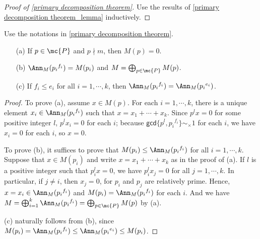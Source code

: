 \begin{proof}[Proof of \cref{primary decomposition theorem}]
    Use the results of \cref{primary decomposition theorem_lemma} inductively.
\end{proof}
\begin{cor}
    Use the notations in \cref{primary decomposition theorem}.
    \begin{enumerate}
        \item[(a)]
        {
            If $p\in\mc{P}$ and $p\nmid m$, then $M(p)=0$.
        }
        \item[(b)]
        {
            $\Ann_M({p_i}^{f_i})=M(p_i)$ and $M=\bigoplus_{p\in\mc{P}} M(p)$.
        }
        \item[(c)]
        {
            If $f_i\leq e_i$ for all $i=1, \cdots, k$, then $\Ann_M({p_i}^{f_i})=\Ann_M({p_i}^{e_i})$.
        }
    \end{enumerate}
\end{cor}
\begin{proof}
    To prove (a), assume $x\in M(p)$.
    For each $i=1, \cdots, k$, there is a unique element $x_i\in\Ann_M({p_i}^{f_i})$ such that $x=x_1+\cdots+x_k$.
    Since $p^l x=0$ for some positive integer $l$, $p^lx_i=0$ for each $i$; because $\textsf{gcd}\{p^l, {p_i}^{f_i}\}\sim_\times 1$ for each $i$, we have $x_i=0$ for each $i$, so $x=0$.

    To prove (b), it suffices to prove that $M(p_i)\leq\Ann_M({p_i}^{f_i})$ for all $i=1, \cdots, k$.
    Suppose that $x\in M(p_i)$ and write $x=x_1+\cdots+x_k$ as in the proof of (a).
    If $l$ is a positive integer such that $p_i^l x=0$, we have $p_i^l x_j=0$ for all $j=1, \cdots, k$.
    In particular, if $j\neq i$, then $x_j=0$, for $p_i$ and $p_j$ are relatively prime.
    Hence, $x=x_i\in\Ann_M({p_i}^{f_i})$ and $M(p_i)=\Ann_M({p_i}^{f_i})$ for each $i$.
    And we have $M=\bigoplus_{i=1}^k\Ann_M({p_i}^{f_i})=\bigoplus_{p\in\mc{P}} M(p)$ by (a).

    (c) naturally follows from (b), since $M(p_i)=\Ann_M({p_i}^{f_i})\leq\Ann_M({p_i}^{e_i})\leq M(p_i)$.
\end{proof}
